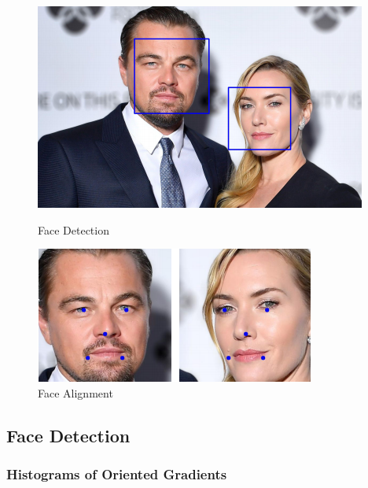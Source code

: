 \documentclass[12pt,english]{article}
\begin{document}
\begin{figure}[!tbp]
  \centering
  \begin{minipage}[b]{0.49\textwidth}
    \includegraphics[width=\textwidth]{figures/face_detection.png}
    \caption{Face Detection \cite{trigueros}}
    \label{fig:detect}
  \end{minipage}
  \hfill
  \begin{minipage}[b]{0.49\textwidth}
    \includegraphics[width=\textwidth]{figures/landmark.png}
    \caption{Face Alignment \cite{trigueros}}
    \label{fig:landmark}
  \end{minipage}
\end{figure}

\subsection{Face Detection}

\subsubsection{Histograms of Oriented Gradients}
\end{document}
